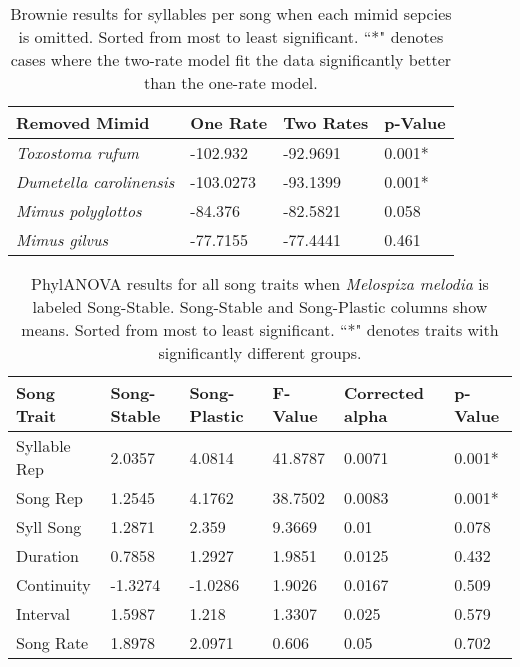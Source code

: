 \documentclass[a4paper,12pt]{article}
\begin{document}
\begin{table}[ht]
\caption{Brownie results for syllables per song when each mimid sepcies is omitted.  Sorted from most to least significant.  ``*" denotes cases where the two-rate model fit the data significantly better than the one-rate model.}
\centering
\begin{tabular}{llll}
  \hline
Removed Mimid & One Rate & Two Rates & p-Value \\ 
  \hline
\textit{Toxostoma rufum} & -102.932 & -92.9691 & 0.001* \\ 
  \textit{Dumetella carolinensis} & -103.0273 & -93.1399 & 0.001* \\ 
  \textit{Mimus polyglottos} & -84.376 & -82.5821 & 0.058 \\ 
  \textit{Mimus gilvus} & -77.7155 & -77.4441 & 0.461 \\ 
   \hline
\end{tabular}
\end{table}



\begin{table}[ht]
\caption{PhylANOVA results for all song traits when \textit{Melospiza melodia} is labeled Song-Stable.  Song-Stable and Song-Plastic columns show means.  Sorted from most to least significant.  ``*" denotes traits with significantly different groups.}
\centering
\begin{tabular}{llllll}
  \hline
Song Trait & Song-Stable & Song-Plastic & F-Value & Corrected alpha & p-Value \\ 
  \hline
Syllable Rep & 2.0357 & 4.0814 & 41.8787 & 0.0071 & 0.001* \\ 
  Song Rep & 1.2545 & 4.1762 & 38.7502 & 0.0083 & 0.001* \\ 
  Syll Song & 1.2871 & 2.359 & 9.3669 & 0.01 & 0.078 \\ 
  Duration & 0.7858 & 1.2927 & 1.9851 & 0.0125 & 0.432 \\ 
  Continuity & -1.3274 & -1.0286 & 1.9026 & 0.0167 & 0.509 \\ 
  Interval & 1.5987 & 1.218 & 1.3307 & 0.025 & 0.579 \\ 
  Song Rate & 1.8978 & 2.0971 & 0.606 & 0.05 & 0.702 \\ 
   \hline
\end{tabular}
\end{table}
\end{document}
